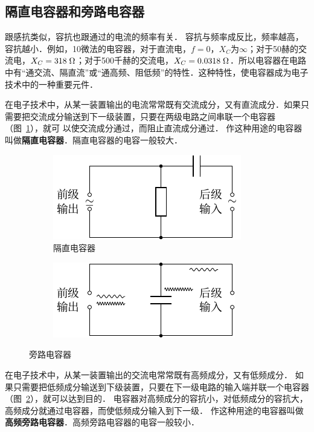 \subsection{隔直电容器和旁路电容器}

跟感抗类似，容抗也跟通过的电流的频率有关．
容抗与频率成反比，频率越高，容抗越小．例如，10微法的电容器，对于直流电，$f=0$，$X_C$为$\infty$；对于50赫的交流电，$X_C=318\;\Omega$；对于500千赫的交流电，$X_C=0.0318\;\Omega$．所以电容器在电路中有“通交流、隔直流”或“通高频、阻低频”的特性．这种特性，使电容器成为电子技术中的一种重要元件．

在电子技术中，从某一装置输出的电流常常既有交流成分，又有直流成分．如果只需要把交流成分输送到下一级装置，只要在两级电路之间串联一个电容器（图~\ref{fig_C_3-19a}），就可
以使交流成分通过，而阻止直流成分通过．
作这种用途的电容器叫做\textbf{隔直电容器}．隔直电容器的电容一般较大．
\begin{figure}[htbp]
    \centering
    \begin{subfigure}{0.4\linewidth}
        \centering
        \includegraphics{fig/C/3-19a.pdf}
        \caption{隔直电容器}\label{fig_C_3-19a}
    \end{subfigure}
    \hfil
    \begin{subfigure}{0.4\linewidth}
        \centering
        \includegraphics{fig/C/3-19b.pdf}
        \caption{}\label{fig_C_3-19b}
    \end{subfigure}
    \caption{旁路电容器}\label{fig_C_3-19}
\end{figure}

在电子技术中，从某一装置输出的交流电常常既有高频成分，又有低频成分．
如果只需要把低频成分输送到下级装置，只要在下一级电路的输入端并联一个电容器（图~\ref{fig_C_3-19b}），就可以达到目的．
电容器对高频成分的容抗小，对低频成分的容抗大，高频成分就通过电容器，而使低频成分输入到下一级．
作这种用途的电容器叫做\textbf{高频旁路电容器}．高频旁路电容器的电容一般较小．

